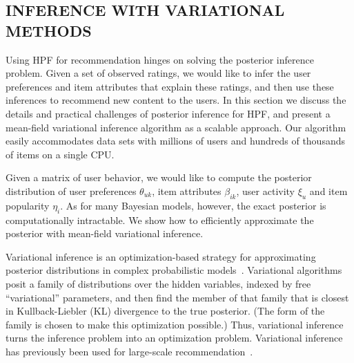 \subsection{INFERENCE WITH VARIATIONAL METHODS}
\label{sec:inference}

Using HPF for recommendation hinges on solving the posterior inference
problem.  Given a set of observed ratings, we would like to infer the
user preferences and item attributes that explain these ratings, and
then use these inferences to recommend new content to the users.  In
this section we discuss the details and practical challenges of
posterior inference for HPF, and present a mean-field variational
inference algorithm as a scalable approach.  Our
algorithm easily accommodates data sets with millions of users and
hundreds of thousands of items on a single CPU.

Given a matrix of user behavior, we would like to
compute the posterior distribution of user preferences $\theta_{uk}$,
item attributes $\beta_{ik}$, user activity $\xi_{u}$ and item
popularity $\eta_i$.  As for many Bayesian models, however, the exact
posterior is computationally intractable. We show how to
efficiently approximate the posterior with mean-field variational
inference.



Variational inference is an optimization-based strategy for
approximating posterior distributions in complex probabilistic
models~\cite{Jordan:1999,Wainwright:2008}.  Variational algorithms
posit a family of distributions over the hidden variables, indexed by
free ``variational'' parameters, and then find the member of that
family that is closest in Kullback-Liebler (KL) divergence to the true
posterior.  (The form of the family is chosen to make this
optimization possible.)  Thus, variational inference turns the
inference problem into an optimization problem.  Variational inference
has previously been used for large-scale
recommendation~\cite{Paquet:2013p9197}.


